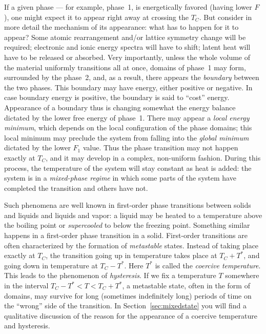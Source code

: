 \documentclass[11pt,a4paper]{article}
\begin{document}
If a given phase --- for example, phase~1, is energetically favored (having lower
$F$), one might expect it to appear right away at crossing the $T_C$. But consider
in more detail the mechanism of its appearance: what has to happen for it to
appear? Some atomic rearrangement and/or lattice symmetry change will be required;
electronic and ionic energy spectra will have to shift; latent heat will have to
be released or absorbed. Very importantly, unless the whole volume of the material
uniformly transitions all at once, domains of phase~1 may form, surrounded by the
phase~2, and, as a result, there appears the \emph{boundary} between the two
phases. This boundary may have energy, either positive or negative. In case
boundary energy is positive, the boundary is said to ``cost'' energy. Appearance
of a boundary thus is changing somewhat the energy balance dictated by the lower
free energy of phase~1. There may appear a \emph{local
energy minimum}, which depends on the local configuration of the phase domains;
this local minimum may preclude the system from falling into the \emph{global
minimum} dictated by the lower $F_1$ value. Thus the phase transition may not
happen exactly at $T_C$, and it may develop in a complex, non-uniform fashion.
During this process, the temperature of the system will stay constant as heat is
added: the system is in a \emph{mixed-phase regime} in which some parts of the
system have completed the transition and others have not.

Such phenomena are well known in first-order phase transitions between solids and
liquids and liquids and vapor: a liquid may be heated to a temperature above the
boiling point or \emph{supercooled} to below the freezing point.
Something similar happens in a first-order phase transition in a solid.
First-order transitions are often characterized by the formation of
\emph{metastable} states. Instead of taking place exactly at $T_C$, the transition
going up in temperature takes place at $T_C + T^{*}$, and going down in
temperature at $T_C - T^{*}$. Here $T^{*}$ is called the \emph{coercive
temperature}. This leads to the phenomenon of \emph{hysteresis}. If we fix a
temperature $T$ somewhere in the interval $T_C - T^{*} < T < T_C + T^{*}$, a
metastable state, often in the form of domains, may survive for long (sometimes
indefinitely long) periods of time on the ``wrong'' side of the transition. In
Section~\ref{sec:mixedstate} you will find a qualitative discussion of the reason
for the appearance of a coercive temperature and hysteresis.
\end{document}
